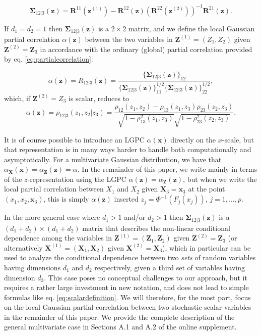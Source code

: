 \documentclass[
  12pt,
  letterpaper]{article}
\newcommand{\X}{\bm{X}}
\newcommand{\Xone}{\bm{X}^{(1)}}
\newcommand{\Xtwo}{\bm{X}^{(2)}}
\newcommand{\x}{\bm{x}}
\newcommand{\Z}{\bm{Z}}
\newcommand{\z}{\bm{z}}
\newcommand{\Zone}{\bm{Z}^{(1)}}
\newcommand{\Ztwo}{\bm{Z}^{(2)}}
\newcommand{\zone}{\bm{z}^{(1)}}
\newcommand{\ztwo}{\bm{z}^{(2)}}
\newcommand{\R}{\bm{R}}
\newcommand{\fSigma}{\bm{\Sigma}}
\theoremstyle{definition}
\theoremstyle{definition}
\theoremstyle{definition}
\theoremstyle{remark}
\begin{document}
\begin{equation}
\fSigma_{12|3}(\z) = \R^{11}(\zone) - \R^{12}(\z)\left(\R^{22}(\ztwo)\right)^{-1}\R^{21}(\z).
\label{eq:matrixlocalpartial}
\end{equation}

If \(d_1=d_2=1\) then \(\fSigma_{12|3}(\z)\) is a \(2\times 2\) matrix, and we define the local Gaussian partial correlation \(\alpha(\z)\) between the two variables in \(\Zone = (Z_1,Z_2)\) given \(\Ztwo = \Z_3\) in accordance with the ordinary (global) partial correlation provided by eq. \eqref{eq:partialcorrelation}:

\begin{equation}
\alpha(\z) = R_{12|3}(\z) = \frac{\Big\{\fSigma_{12|3}(\z)\Big\}_{12}}{\Big\{\fSigma_{12|3}(\z)\Big\}^{1/2}_{11}\Big\{\fSigma_{12|3}(\z)\Big\}^{1/2}_{22}},
\label{eq:definition}
\end{equation}
which, if \(\Ztwo = Z_3\) is scalar, reduces to
\begin{equation}
\alpha(\z) = \rho_{12|3}(z_1, z_2|z_3) = \frac{\rho_{12}(z_1, z_2) - \rho_{13}(z_1,z_3)\rho_{23}(z_2,z_3)}{\sqrt{1 - \rho^2_{13}(z_1,z_3)}\sqrt{1 - \rho^2_{23}(z_2, z_3)}}.
\label{eq:scalardefinition}
\end{equation}

It is of course possible to introduce an LGPC \(\alpha(\x)\) directly on the \(x\)-scale, but that representation is in many ways harder to handle both computationally and asymptotically. For a multivariate Gaussian distribution, we have that \(\alpha_{\X}(\x) = \alpha_{\Z}(\z) = \alpha\). In the remainder of this paper, we write mainly in terms of the \(z\)-representation using the LGPC \(\alpha(\z) = \alpha_{\Z}(\z)\), but when we write the local partial correlation between \(X_1\) and \(X_2\) given \(\X_3 = \x_3\) at the point \((x_1,x_2,\x_3)\), this is simply \(\alpha(\z)\) inserted \(z_j = \Phi^{-1}(F_{j}(x_j))\), \(j=1,\ldots,p\).

In the more general case where \(d_1 > 1\) and/or \(d_2 > 1\) then \(\fSigma_{12|3}(\z)\) is a \((d_1+d_2)\times (d_1+d_2)\) matrix that describes the non-linear conditional dependence among the variables in \(\Zone = (\Z_1, \Z_2)\) given \(\Ztwo = \Z_3\) (or alternatively \(\Xone = (\X_1, \X_2)\) given \(\Xtwo = \X_3\)), which in particular can be used to analyze the conditional dependence between two \emph{sets} of random variables having dimensions \(d_1\) and \(d_2\) respectively, given a third set of variables having dimension \(d_3\). This case poses no conceptual challenges to our approach, but it requires a rather large investment in new notation, and does not lead to simple formulas like eq. \eqref{eq:scalardefinition}. We will therefore, for the most part, focus on the local Gaussian partial correlation between two stochastic scalar variables in the remainder of this paper. We provide the complete description of the general multivariate case in Sections A.1 and A.2 of the online supplement.
\end{document}
